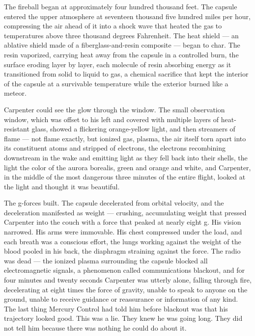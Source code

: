 \documentclass[12pt, letterpaper]{article}
\begin{document}
\vspace{1em}

The fireball began at approximately four hundred thousand feet. The capsule entered the upper atmosphere at seventeen thousand five hundred miles per hour, compressing the air ahead of it into a shock wave that heated the gas to temperatures above three thousand degrees Fahrenheit. The heat shield --- an ablative shield made of a fiberglass-and-resin composite --- began to char. The resin vaporized, carrying heat away from the capsule in a controlled burn, the surface eroding layer by layer, each molecule of resin absorbing energy as it transitioned from solid to liquid to gas, a chemical sacrifice that kept the interior of the capsule at a survivable temperature while the exterior burned like a meteor.

Carpenter could see the glow through the window. The small observation window, which was offset to his left and covered with multiple layers of heat-resistant glass, showed a flickering orange-yellow light, and then streamers of flame --- not flame exactly, but ionized gas, plasma, the air itself torn apart into its constituent atoms and stripped of electrons, the electrons recombining downstream in the wake and emitting light as they fell back into their shells, the light the color of the aurora borealis, green and orange and white, and Carpenter, in the middle of the most dangerous three minutes of the entire flight, looked at the light and thought it was beautiful.

The g-forces built. The capsule decelerated from orbital velocity, and the deceleration manifested as weight --- crushing, accumulating weight that pressed Carpenter into the couch with a force that peaked at nearly eight g. His vision narrowed. His arms were immovable. His chest compressed under the load, and each breath was a conscious effort, the lungs working against the weight of the blood pooled in his back, the diaphragm straining against the force. The radio was dead --- the ionized plasma surrounding the capsule blocked all electromagnetic signals, a phenomenon called communications blackout, and for four minutes and twenty seconds Carpenter was utterly alone, falling through fire, decelerating at eight times the force of gravity, unable to speak to anyone on the ground, unable to receive guidance or reassurance or information of any kind. The last thing Mercury Control had told him before blackout was that his trajectory looked good. This was a lie. They knew he was going long. They did not tell him because there was nothing he could do about it.
\end{document}
